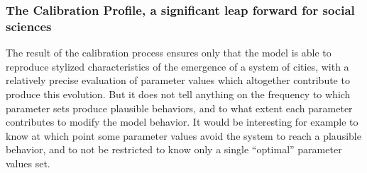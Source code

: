 \documentclass[10pt]{article}
\begin{document}
\subsubsection*{The Calibration Profile, a significant leap forward for social sciences}


The result of the calibration process ensures only that the model is able to reproduce stylized characteristics of the emergence of a system of cities, with a relatively precise evaluation of parameter values which altogether contribute to produce this evolution. But it does not tell anything on the frequency to which parameter sets produce plausible behaviors, and to what extent each parameter contributes to modify the model behavior. It would be interesting for example to know at which point some parameter values avoid the system to reach a plausible behavior, and to not be restricted to know only a single ``optimal'' parameter values set.
\end{document}
